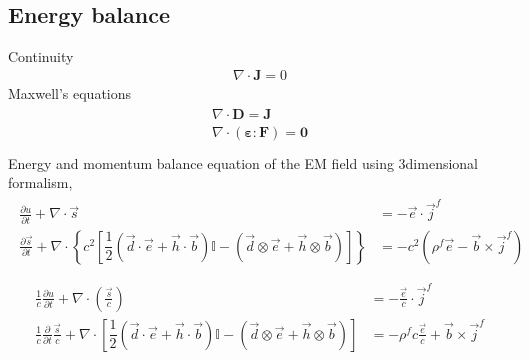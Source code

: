 \documentclass[letterpaper,10pt,english]{jupyterBook}
\begin{document}
\subsection{Energy balance}
\label{\detokenize{ch/relativity-special/notes:energy-balance}}
\sphinxAtStartPar
Continuity
\begin{equation*}
\begin{split}\nabla \cdot \mathbf{J} = 0\end{split}
\end{equation*}
\sphinxAtStartPar
Maxwell’s equations
\begin{equation*}
\begin{split}\begin{aligned}
  \nabla \cdot \mathbf{D} = \mathbf{J} \\
  \nabla \cdot \left( \symbf{\varepsilon} : \mathbf{F} \right) = \mathbf{0} \\
\end{aligned}\end{split}
\end{equation*}
\sphinxAtStartPar
Energy and momentum balance equation of the EM field using 3\sphinxhyphen{}dimensional formalism,
\begin{equation*}
\begin{split}\begin{aligned}
  \frac{\partial u      }{\partial t} + \nabla \cdot \vec{s} & = - \vec{e} \cdot \vec{j}^f \\
  \frac{\partial \vec{s}}{\partial t} + \nabla \cdot \left\{ c^2 \left[ \dfrac{1}{2} \left( \vec{d} \cdot \vec{e} + \vec{h} \cdot \vec{b} \right) \mathbb{I} - \left( \vec{d} \otimes \vec{e} + \vec{h} \otimes \vec{b} \right) \right] \right\} & = - c^2 (\rho^f \vec{e} - \vec{b} \times \vec{j}^f) \\
\end{aligned}\end{split}
\end{equation*}\begin{equation}\label{equation:ch/relativity-special/notes:eq:energy-momentum-equation:3d}
\begin{split}\begin{aligned}
  \frac{1}{c} \frac{\partial u}{\partial t} + \nabla \cdot \left( \frac{\vec{s}}{c} \right) & = - \frac{\vec{e}}{c} \cdot \vec{j}^f \\
  \frac{1}{c} \frac{\partial}{\partial t} \frac{ \vec{s}}{c} + \nabla \cdot \left[ \dfrac{1}{2} \left( \vec{d} \cdot \vec{e} + \vec{h} \cdot \vec{b} \right) \mathbb{I} - \left( \vec{d} \otimes \vec{e} + \vec{h} \otimes \vec{b} \right) \right] & = - \rho^f c \frac{\vec{e}}{c} + \vec{b} \times \vec{j}^f \\
\end{aligned}\end{split}
\end{equation}
\end{document}
